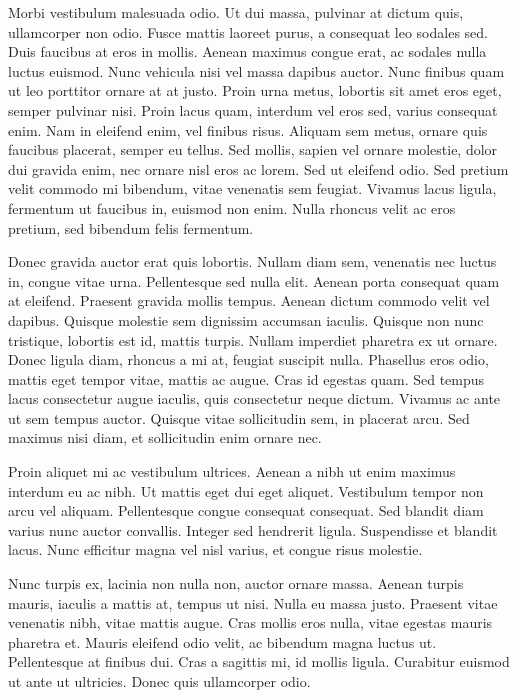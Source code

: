 Morbi vestibulum malesuada odio. Ut dui massa, pulvinar at dictum quis, ullamcorper non odio. Fusce mattis laoreet purus, a consequat leo sodales sed. Duis faucibus at eros in mollis. Aenean maximus congue erat, ac sodales nulla luctus euismod. Nunc vehicula nisi vel massa dapibus auctor. Nunc finibus quam ut leo porttitor ornare at at justo. Proin urna metus, lobortis sit amet eros eget, semper pulvinar nisi. Proin lacus quam, interdum vel eros sed, varius consequat enim. Nam in eleifend enim, vel finibus risus. Aliquam sem metus, ornare quis faucibus placerat, semper eu tellus. Sed mollis, sapien vel ornare molestie, dolor dui gravida enim, nec ornare nisl eros ac lorem. Sed ut eleifend odio. Sed pretium velit commodo mi bibendum, vitae venenatis sem feugiat. Vivamus lacus ligula, fermentum ut faucibus in, euismod non enim. Nulla rhoncus velit ac eros pretium, sed bibendum felis fermentum.

Donec gravida auctor erat quis lobortis. Nullam diam sem, venenatis nec luctus in, congue vitae urna. Pellentesque sed nulla elit. Aenean porta consequat quam at eleifend. Praesent gravida mollis tempus. Aenean dictum commodo velit vel dapibus. Quisque molestie sem dignissim accumsan iaculis. Quisque non nunc tristique, lobortis est id, mattis turpis. Nullam imperdiet pharetra ex ut ornare. Donec ligula diam, rhoncus a mi at, feugiat suscipit nulla. Phasellus eros odio, mattis eget tempor vitae, mattis ac augue. Cras id egestas quam. Sed tempus lacus consectetur augue iaculis, quis consectetur neque dictum. Vivamus ac ante ut sem tempus auctor. Quisque vitae sollicitudin sem, in placerat arcu. Sed maximus nisi diam, et sollicitudin enim ornare nec.

Proin aliquet mi ac vestibulum ultrices. Aenean a nibh ut enim maximus interdum eu ac nibh. Ut mattis eget dui eget aliquet. Vestibulum tempor non arcu vel aliquam. Pellentesque congue consequat consequat. Sed blandit diam varius nunc auctor convallis. Integer sed hendrerit ligula. Suspendisse et blandit lacus. Nunc efficitur magna vel nisl varius, et congue risus molestie.

Nunc turpis ex, lacinia non nulla non, auctor ornare massa. Aenean turpis mauris, iaculis a mattis at, tempus ut nisi. Nulla eu massa justo. Praesent vitae venenatis nibh, vitae mattis augue. Cras mollis eros nulla, vitae egestas mauris pharetra et. Mauris eleifend odio velit, ac bibendum magna luctus ut. Pellentesque at finibus dui. Cras a sagittis mi, id mollis ligula. Curabitur euismod ut ante ut ultricies. Donec quis ullamcorper odio.

